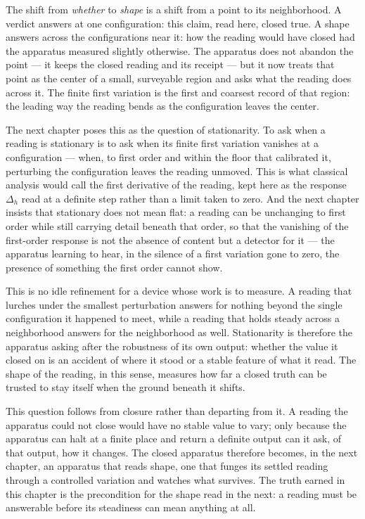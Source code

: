 The shift from \emph{whether} to \emph{shape} is a shift from a point to its neighborhood. A verdict answers at one configuration: this claim, read here, closed true. A shape answers across the configurations near it: how the reading would have closed had the apparatus measured slightly otherwise. The apparatus does not abandon the point --- it keeps the closed reading and its receipt --- but it now treats that point as the center of a small, surveyable region and asks what the reading does across it. The finite first variation is the first and coarsest record of that region: the leading way the reading bends as the configuration leaves the center.

The next chapter poses this as the question of stationarity. To ask when a reading is stationary is to ask when its finite first variation vanishes at a configuration --- when, to first order and within the floor that calibrated it, perturbing the configuration leaves the reading unmoved. This is what classical analysis would call the first derivative of the reading, kept here as the response $\Delta_h$ read at a definite step rather than a limit taken to zero. And the next chapter insists that stationary does not mean flat: a reading can be unchanging to first order while still carrying detail beneath that order, so that the vanishing of the first-order response is not the absence of content but a detector for it --- the apparatus learning to hear, in the silence of a first variation gone to zero, the presence of something the first order cannot show.

This is no idle refinement for a device whose work is to measure. A reading that lurches under the smallest perturbation answers for nothing beyond the single configuration it happened to meet, while a reading that holds steady across a neighborhood answers for the neighborhood as well. Stationarity is therefore the apparatus asking after the robustness of its own output: whether the value it closed on is an accident of where it stood or a stable feature of what it read. The shape of the reading, in this sense, measures how far a closed truth can be trusted to stay itself when the ground beneath it shifts.

This question follows from closure rather than departing from it. A reading the apparatus could not close would have no stable value to vary; only because the apparatus can halt at a finite place and return a definite output can it ask, of that output, how it changes. The closed apparatus therefore becomes, in the next chapter, an apparatus that reads shape, one that funges its settled reading through a controlled variation and watches what survives. The truth earned in this chapter is the precondition for the shape read in the next: a reading must be answerable before its steadiness can mean anything at all.

